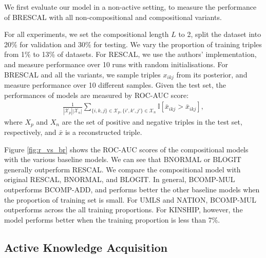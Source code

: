 We first evaluate our model in a non-active setting, 
to measure the performance of BRESCAL with all non-compositional and compositional variants.

For all experiments, we set the compositional length $L$ to 2, split the dataset into 20\% for validation and 30\% for testing. We vary the proportion of training triples
from 1\% to 13\% of datasets. For RESCAL, we use the authors' implementation, and measure performance over 10 runs with random initialisations. For BRESCAL and all the variants, we sample triples $x_{ikj}$ from its posterior, and measure performance over 10 different samples.
Given the test set, the performances of models are measured by ROC-AUC score:
\begin{align}
\frac{1}{|\mathcal{X}_p|  |\mathcal{X}_n|} \sum_{\{i,k,j\} \in \mathcal{X}_p, \{i',k',j'\} \in \mathcal{X}_n} \mathbb{I}[\bar{x}_{ikj} > \bar{x}_{ikj}],
\end{align}
where $X_p$ and $X_n$ are the set of positive and negative triples in the test set, respectively, and $\bar{x}$ is a reconstructed triple.

Figure \ref{fig:r_vs_br} shows the ROC-AUC scores of the compositional models with the various baseline models. We can see that BNORMAL or BLOGIT generally outperform RESCAL. We compare the compositional model with original RESCAL, BNORMAL, and BLOGIT. In general, BCOMP-MUL outperforms BCOMP-ADD, and performs better the other baseline models when the proportion of training set is small. For UMLS and NATION, BCOMP-MUL outperforms across the all training proportions. For KINSHIP, however, the model performs better when the training proportion is less than 7\%.


\subsection{Active Knowledge Acquisition}

